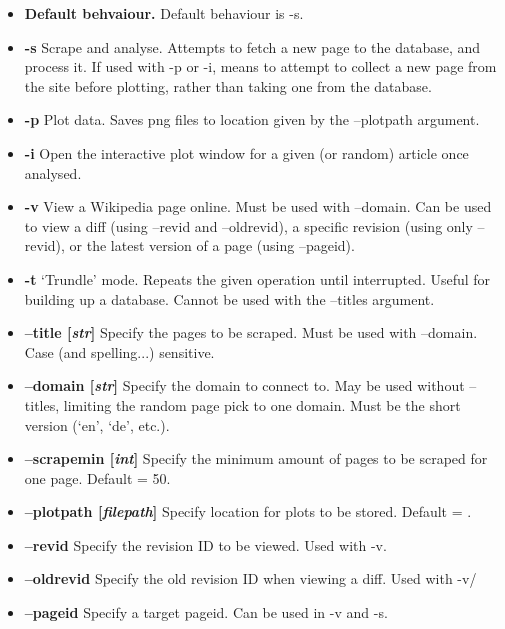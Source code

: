 \begin{itemize}[label={}]
  \item \textbf{Default behvaiour.} Default behaviour is -s.
  \item \textbf{-s} Scrape and analyse. Attempts to fetch a new page
    to the database, and process it. If used with -p or -i, means to
    attempt to collect a new page from the site before plotting,
    rather than taking one from the database.
  \item \textbf{-p} Plot data. Saves png files to location given by
    the --plotpath argument.
  \item \textbf{-i} Open the interactive plot window for a given (or
    random) article once analysed.
  \item \textbf{-v} View a Wikipedia page online. Must be used with
    --domain. Can be used to view a diff (using --revid and
    --oldrevid), a specific revision (using only --revid), or the
    latest version of a page (using --pageid).
  \item \textbf{-t} `Trundle' mode. Repeats the given operation until
    interrupted. Useful for building up a database. Cannot be used
    with the --titles argument.
  \item \textbf{--title [\textit{str}]} Specify the
    pages to be scraped. Must be used with --domain. Case (and
    spelling...)  sensitive.
  \item \textbf{--domain [\textit{str}]} Specify the domain to connect
    to. May be used without --titles, limiting the random page pick to
    one domain. Must be the short version (`en', `de', etc.).
  \item \textbf{--scrapemin [\textit{int}]} Specify the minimum amount of
    pages to be scraped for one page. Default = 50.
  \item \textbf{--plotpath [\textit{filepath}]} Specify location for
    plots to be stored. Default = .
  \item \textbf{--revid} Specify the revision ID to be viewed. Used
    with -v.
  \item \textbf{--oldrevid} Specify the old revision ID when viewing a
    diff. Used with -v/
  \item \textbf{--pageid} Specify a target pageid. Can be used in -v
    and -s.
\end{itemize}
